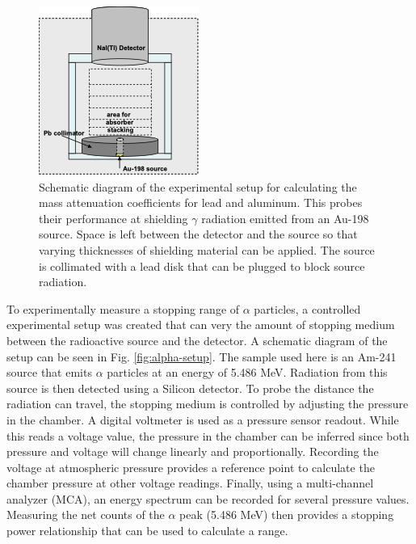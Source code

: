 \begin{figure}
\centering
\includegraphics[scale=0.7]{gamma_setup.png}
\caption{Schematic diagram of the experimental setup for calculating the mass attenuation coefficients for lead and aluminum. This probes their performance at shielding $\gamma$ radiation emitted from an Au-198 source. Space is left between the detector and the source so that varying thicknesses of shielding material can be applied. The source is collimated with a lead disk that can be plugged to block source radiation.}
\label{fig:gamma-setup}
\end{figure}

To experimentally measure a stopping range of $\alpha$ particles, a controlled experimental setup was created that can very the amount of stopping medium between the radioactive source and the detector. A schematic diagram of the setup can be seen in Fig. \ref{fig:alpha-setup}. The sample used here is an Am-241 source that emits $\alpha$ particles at an energy of 5.486 MeV. Radiation from this source is then detected using a Silicon detector. To probe the distance the radiation can travel, the stopping medium is controlled by adjusting the pressure in the chamber. A digital voltmeter is used as a pressure sensor readout. While this reads a voltage value, the pressure in the chamber can be inferred since both pressure and voltage will change linearly and proportionally. Recording the voltage at atmospheric pressure provides a reference point to calculate the chamber pressure at other voltage readings. Finally, using a multi-channel analyzer (MCA), an energy spectrum can be recorded for several pressure values. Measuring the net counts of the $\alpha$ peak (5.486 MeV) then provides a stopping power relationship that can be used to calculate a range.

